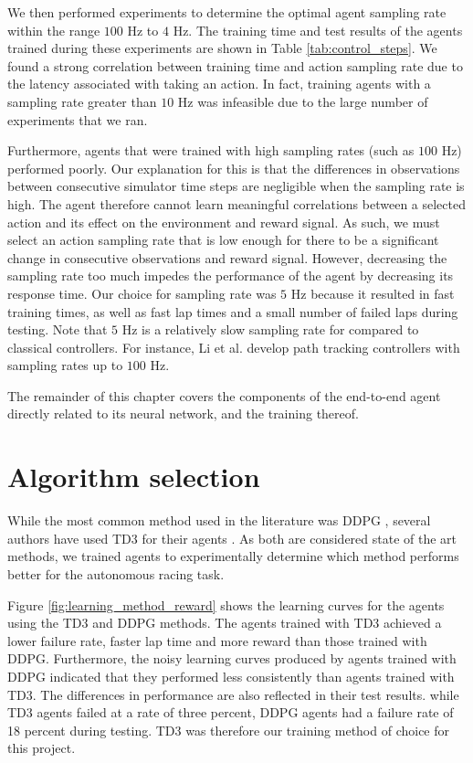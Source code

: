 We then performed experiments to determine the optimal agent sampling rate within the range $100$ Hz to $4$ Hz.
The training time and test results of the agents trained during these experiments are shown in Table \ref{tab:control_steps}.
We found a strong correlation between training time and action sampling rate due to the latency associated with taking an action.
In fact, training agents with a sampling rate greater than $10$ Hz was infeasible due to the large number of experiments that we ran. 

Furthermore, agents that were trained with high sampling rates (such as $100$ Hz) performed poorly.
Our explanation for this is that the differences in observations between consecutive simulator time steps are negligible when the sampling rate is high.
The agent therefore cannot learn meaningful correlations between a selected action and its effect on the environment and reward signal.
As such, we must select an action sampling rate that is low enough for there to be a significant change in consecutive observations and reward signal.
However, decreasing the sampling rate too much impedes the performance of the agent by decreasing its response time.
Our choice for sampling rate was $5$ Hz because it resulted in fast training times, as well as fast lap times and a small number of failed laps during testing.
Note that $5$ Hz is a relatively slow sampling rate for compared to classical controllers.
For instance, Li et al. \cite{Li2019} develop path tracking controllers with sampling rates up to $100$ Hz.



The remainder of this chapter covers the components of the end-to-end agent directly related to its neural network, and the training thereof.

\section{Algorithm selection}
\label{sec:algorithm_selection}

While the most common method used in the literature was DDPG \cite{Ivanov2020, Capo2020, Niu2020, Remonda2021, brunnbauer2021}, several authors have used TD3 for their agents \cite{Ivanov2020, Evans2021b, Evans2021a}.
As both are considered state of the art methods, we trained agents to experimentally determine which method performs better for the autonomous racing task.

Figure \ref{fig:learning_method_reward} shows the learning curves for the agents using the TD3 and DDPG methods.
The agents trained with TD3 achieved a lower failure rate, faster lap time and more reward than those trained with DDPG.
Furthermore, the noisy learning curves produced by agents trained with DDPG indicated that they performed less consistently than agents trained with TD3.
The differences in performance are also reflected in their test results.
while TD3 agents failed at a rate of three percent, DDPG agents had a failure rate of 18 percent during testing.
TD3 was therefore our training method of choice for this project.

